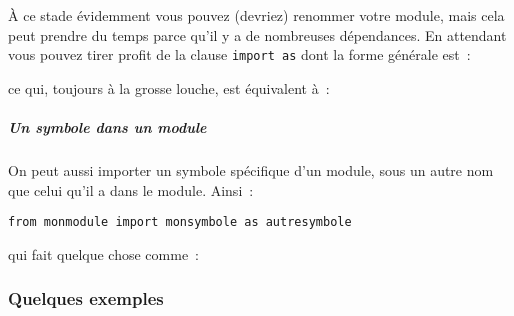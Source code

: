     À ce stade évidemment vous pouvez (devriez) renommer votre module, mais
cela peut prendre du temps parce qu'il y a de nombreuses dépendances. En
attendant vous pouvez tirer profit de la clause \texttt{import\ as} dont
la forme générale est~:

    \begin{Shaded}
\begin{Highlighting}[frame=lines,framerule=0.6mm,rulecolor=\color{asisframecolor}]
\end{Highlighting}
\end{Shaded}

    ce qui, toujours à la grosse louche, est équivalent à~:

    \begin{Shaded}
\begin{Highlighting}[frame=lines,framerule=0.6mm,rulecolor=\color{asisframecolor}]
\OperatorTok{=}\NormalTok{)}
\end{Highlighting}
\end{Shaded}

    \hypertarget{un-symbole-dans-un-module}{%
\subparagraph{Un symbole dans un
module}\label{un-symbole-dans-un-module}}

    On peut aussi importer un symbole spécifique d'un module, sous un autre
nom que celui qu'il a dans le module. Ainsi~:

    \begin{verbatim}
from monmodule import monsymbole as autresymbole
\end{verbatim}

    qui fait quelque chose comme~:

    \begin{Shaded}
\begin{Highlighting}[frame=lines,framerule=0.6mm,rulecolor=\color{asisframecolor}]
\OperatorTok{=}\NormalTok{)}
\OperatorTok{=}
\end{Highlighting}
\end{Shaded}

    \hypertarget{quelques-exemples}{%
\subsubsection{Quelques exemples}\label{quelques-exemples}}


